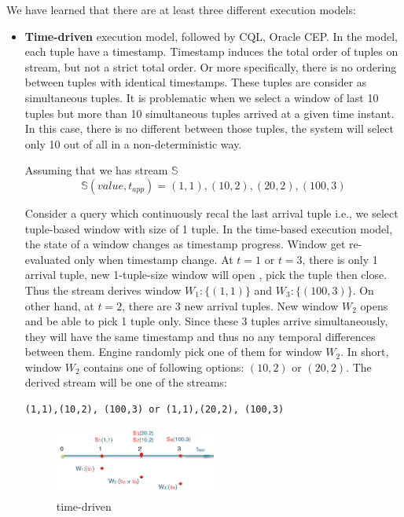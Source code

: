 We have learned that there are at least three different execution models:
\begin{itemize}
	\item \textbf{Time-driven} execution model, followed by CQL, Oracle CEP. In the model, each tuple have a timestamp. Timestamp induces the total order of tuples on stream, but not a strict total order. Or more specifically, there is no ordering between tuples with identical timestamps. These tuples are consider as simultaneous tuples. It is problematic when we select a window of last 10 tuples but more than 10 simultaneous tuples arrived at a given time instant. In this case, there is no different between those tuples, the system will select only 10 out of all in a non-deterministic way.
	
Assuming that we has stream $\mathbb{S}$
	\begin{equation}
			\mathbb{S}(value, t_{app}) = (1,1),(10,2),(20,2), (100,3)
	\end{equation}
	

	
Consider a query which continuously recal the last arrival tuple i.e., we select tuple-based window with size of 1 tuple. In the time-based execution model,  the state of a window changes as timestamp progress. Window get re-evaluated only when timestamp change. At $t=1$ or $t=3$, there is only 1 arrival tuple, new 1-tuple-size window will open , pick the tuple then close. Thus the stream derives window $W_1: \{(1,1)\}$ and $W_3: \{(100,3)\}$. On other hand, at $t=2$, there are 3 new arrival tuples. New window $W_2$ opens and be able to pick 1 tuple only. Since these 3 tuples arrive simultaneously, they will have the same timestamp and thus no any temporal differences between them.
Engine randomly pick one of them for window $W_2$. In short, window $W_2$ contains one of following options: $(10,2)$ or $(20,2)$. The derived stream will be one of the streams:
\begin{verbatim}
(1,1),(10,2), (100,3) or (1,1),(20,2), (100,3)
\end{verbatim}

\begin{figure}[htbp!] 
\centering    
\includegraphics[width=0.5\textwidth]{time-driven}
\caption{time-driven}
\label{fig:time-driven}
\end{figure}
	

\end{itemize}
